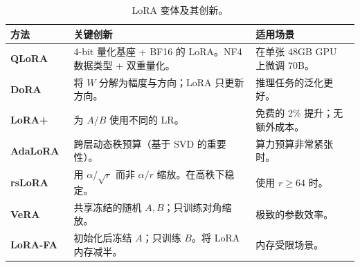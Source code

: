 \begin{table}[ht!]
\centering\small
\caption{LoRA 变体及其创新。}
\noindent\begin{tabularx}{\linewidth}{@{}l Z{1.32} Z{0.68}@{}}
\toprule
\textbf{方法} & \textbf{关键创新} & \textbf{适用场景} \\
\midrule
\textbf{QLoRA}~\cite{dettmers2023qlora} & 4-bit 量化基座 + BF16 的 LoRA。NF4 数据类型 + 双重量化。 & 在单张 48GB GPU 上微调 70B。 \\
\textbf{DoRA}~\cite{liu2024dora} & 将 $W$ 分解为幅度与方向；LoRA 只更新方向。 & 推理任务的泛化更好。 \\
\textbf{LoRA+}~\cite{hayou2024loraplus} & 为 $A$/$B$ 使用不同的 LR。 & 免费的 2\% 提升；无额外成本。 \\
\textbf{AdaLoRA}~\cite{zhang2023adalora} & 跨层动态秩预算（基于 SVD 的重要性）。 & 算力预算非常紧张时。 \\
\textbf{rsLoRA}~\cite{kalajdzievski2023rslora} & 用 $\alpha/\sqrt{r}$ 而非 $\alpha/r$ 缩放。在高秩下稳定。 & 使用 $r \geq 64$ 时。 \\
\textbf{VeRA}~\cite{kopiczko2024vera} & 共享冻结的随机 $A, B$；只训练对角缩放。 & 极致的参数效率。 \\
\textbf{LoRA-FA} & 初始化后冻结 $A$；只训练 $B$。将 LoRA 内存减半。 & 内存受限场景。 \\
\bottomrule
\end{tabularx}
\end{table}

